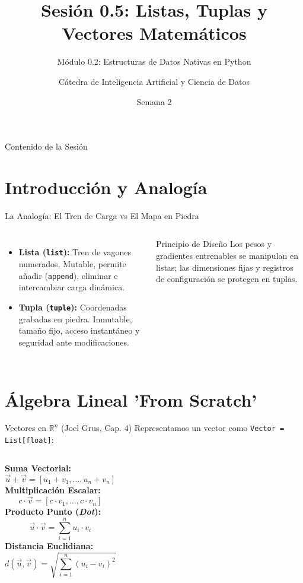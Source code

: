 \documentclass[aspectratio=169]{beamer}
\title[INT210 - Sesión 0.5]{Sesión 0.5: Listas, Tuplas y Vectores Matemáticos}
\subtitle{Módulo 0.2: Estructuras de Datos Nativas en Python}
\author[Diplomado en Ciencia de Datos]{Cátedra de Inteligencia Artificial y Ciencia de Datos}
\institute[INT210]{Machine Learning From Scratch}
\date{Semana 2}
\begin{document}
\frame{\titlepage}

\begin{frame}{Contenido de la Sesión}
    \tableofcontents
\end{frame}

\section{Introducción y Analogía}

\begin{frame}{La Analogía: El Tren de Carga vs El Mapa en Piedra}
    \begin{columns}
        \begin{itemize}
            \item \textbf{Lista (\texttt{list}):} Tren de vagones numerados. Mutable, permite añadir (\texttt{append}), eliminar e intercambiar carga dinámica.
            \item \textbf{Tupla (\texttt{tuple}):} Coordenadas grabadas en piedra. Inmutable, tamaño fijo, acceso instantáneo y seguridad ante modificaciones.
        \end{itemize}
        \begin{alertblock}{Principio de Diseño}
            Los pesos y gradientes entrenables se manipulan en listas; las dimensiones fijas y registros de configuración se protegen en tuplas.
        \end{alertblock}
    \end{columns}
\end{frame}

\section{Álgebra Lineal 'From Scratch'}

\begin{frame}{Vectores en $\mathbb{R}^n$ (Joel Grus, Cap. 4)}
    Representamos un vector como \texttt{Vector = List[float]}:
    \begin{columns}
        \textbf{Suma Vectorial:}
        \begin{equation*}
            \vec{u} + \vec{v} = [u_1 + v_1, \dots, u_n + v_n]
        \end{equation*}
        \textbf{Multiplicación Escalar:}
        \begin{equation*}
            c \cdot \vec{v} = [c \cdot v_1, \dots, c \cdot v_n]
        \end{equation*}
        \textbf{Producto Punto (\textit{Dot}):}
        \begin{equation*}
            \vec{u} \cdot \vec{v} = \sum_{i=1}^n u_i \cdot v_i
        \end{equation*}
        \textbf{Distancia Euclidiana:}
        \begin{equation*}
            d(\vec{u}, \vec{v}) = \sqrt{\sum_{i=1}^n (u_i - v_i)^2}
        \end{equation*}
    \end{columns}
\end{frame}
\end{document}
